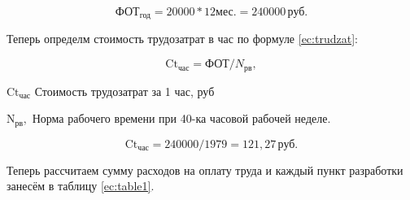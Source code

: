 \begin{equation*}
    \text{ФОТ}_\text{год} = 20 000 * 12 \text{мес.} = 240 000 \, \text{руб.}
\end{equation*}

Теперь определм стоимость трудозатрат в час по формуле \ref{ec:trudzat}:

\begin{equation}
    \label{ec:trudzat}
    \text{Ct}_\text{час} = \text{ФОТ} / N_\text{рв},
\end{equation}

\begin{eqexpl}[5ex]
    \item{$\text{Ct}_\text{час}$}  Стоимость трудозатрат за 1 час, руб
    \item{$\text{N}_\text{рв},$} Норма рабочего времени при 40-ка часовой рабочей
неделе.
\end{eqexpl}

\begin{equation*}
    \text{Ct}_\text{час} = 240 000 / 1979 = 121,27 \, \text{руб}.
\end{equation*}

Теперь рассчитаем сумму расходов на оплату труда и каждый пункт
разработки занесём в таблицу \ref{ec:table1}.

